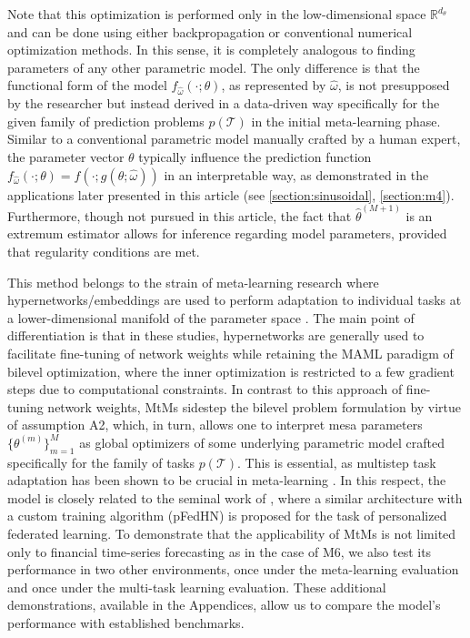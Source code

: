 \documentclass[3p,times,twocolumn]{elsarticle}
\begin{document}
Note that this optimization is performed only in the low-dimensional space $\mathbb{R}^{d_{\theta}}$ and can be done using either backpropagation or conventional numerical optimization methods.
In this sense, it is completely analogous to finding parameters of any other parametric model.
The only difference is that the functional form of the model $f_{\hat{\omega}}(\cdot;\theta)$, as represented by $\hat{\omega}$, is not presupposed by the researcher but instead derived in a data-driven way specifically for the given family of prediction problems $p(\mathcal{T})$ in the initial meta-learning phase.
Similar to a conventional parametric model manually crafted by a human expert, the parameter vector  $\theta$ typically influence the prediction function $f_{\hat{\omega}}(\cdot;\theta)=f(\cdot;g(\theta;\hat{\omega}))$ in an interpretable way, as demonstrated in the applications later presented in this article (see \ref{section:sinusoidal}, \ref{section:m4}).
Furthermore, though not pursued in this article, the fact that $\hat{\theta}^{(M+1)}$ is an extremum estimator allows for inference regarding model parameters, provided that regularity conditions are met.

This method belongs to the strain of meta-learning research where hypernetworks/embeddings are used to perform adaptation to individual tasks at a lower-dimensional manifold of the parameter space \citep[see, e.g.,][]{leeGradientBasedMetaLearningLearned2018,zintgrafFastContextAdaptation2019,zhaoMetaLearningHypernetworks2020, flennerhagMetaLearningWarpedGradient2020, vonoswaldContinualLearningHypernetworks2022, navaMetaLearningClassifierFree2023, ramanarayananGeneralizingSupervisedDeep2023}.
The main point of differentiation is that in these studies, hypernetworks are generally used to facilitate fine-tuning of network weights while retaining the MAML paradigm of bilevel optimization, where the inner optimization is restricted to a few gradient steps due to computational constraints. 
In contrast to this approach of fine-tuning network weights, MtMs sidestep the bilevel problem formulation by virtue of assumption A2, which, in turn, allows one to interpret mesa parameters $\{\theta^{(m)}\}_{m=1}^{M}$ as global optimizers of some underlying parametric model crafted specifically for the family of tasks $p(\mathcal{T})$.
This is essential, as multistep task adaptation has been shown to be crucial in meta-learning \citep{linLearnEffectiveFeatures2020}. 
In this respect, the model is closely related to the seminal work of \citet{shamsianPersonalizedFederatedLearning2021}, where a similar architecture with a custom training algorithm (pFedHN) is proposed for the task of personalized federated learning.
To demonstrate that the applicability of MtMs is not limited only to financial time-series forecasting as in the case of M6, we also test its performance in two other environments, once under the meta-learning evaluation and once under the multi-task learning evaluation.
These additional demonstrations, available in the Appendices, allow us to compare the model's performance with established benchmarks.
\end{document}
